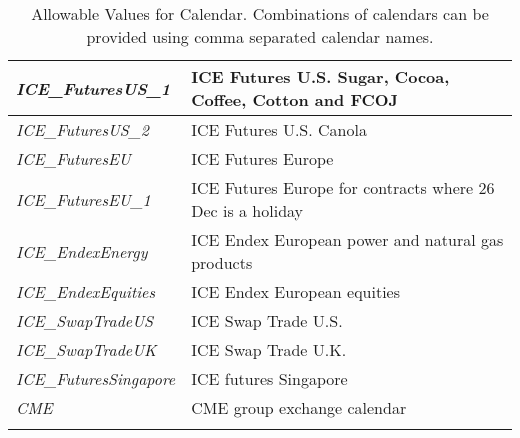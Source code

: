 \begin{longtable}{| p{} | p{} |}
    \emph{ICE\_FuturesUS\_1} & ICE Futures U.S. Sugar, Cocoa, Coffee, Cotton and FCOJ \\ \hline
    \emph{ICE\_FuturesUS\_2} & ICE Futures U.S. Canola \\ \hline
    \emph{ICE\_FuturesEU} & ICE Futures Europe \\ \hline
    \emph{ICE\_FuturesEU\_1} & ICE Futures Europe for contracts where 26 Dec is a holiday \\ \hline
    \emph{ICE\_EndexEnergy} & ICE Endex European power and natural gas products \\ \hline
    \emph{ICE\_EndexEquities} & ICE Endex European equities \\ \hline
    \emph{ICE\_SwapTradeUS} & ICE Swap Trade U.S. \\ \hline
    \emph{ICE\_SwapTradeUK} & ICE Swap Trade U.K. \\ \hline
    \emph{ICE\_FuturesSingapore} & ICE futures Singapore \\ \hline
    \emph{CME} & CME group exchange calendar \\ \hline
  \caption{Allowable Values for Calendar. Combinations of calendars can be provided using comma separated calendar names.}
  \label{tab:calendar}
\end{longtable}

